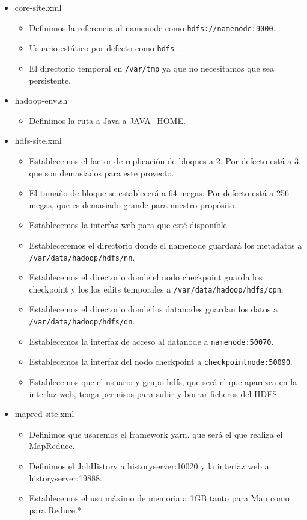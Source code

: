 \begin{itemize}
\item core-site.xml
  \begin{itemize}
  \item Definimos la referencia al namenode como {\tt hdfs://namenode:9000}.
  \item Usuario estático por defecto como {\tt hdfs} .
  \item El directorio temporal en {\tt /var/tmp} ya que no necesitamos que sea
    persistente.
  \end{itemize}

\item hadoop-env.sh
  \begin{itemize}
  \item Definimos la ruta a Java a JAVA\_HOME.
  \end{itemize}

\item hdfs-site.xml
  \begin{itemize}
  \item Establecemos el factor de replicación de bloques a 2. Por defecto
    está a 3, que son demasiados para este proyecto.
  \item El tamaño de bloque se establecerá a 64 megas. Por defecto está a
    256 megas, que es demasiado grande para nuestro propósito.
  \item Establecemos la interfaz web para que esté disponible.
  \item Estableceremos el directorio donde el namenode guardará los
    metadatos a {\tt /var/data/hadoop/hdfs/nn}.
  \item Establecemos el directorio donde el nodo checkpoint guarda los
    checkpoint y los los edits temporales a {\tt /var/data/hadoop/hdfs/cpn}.
  \item Establecemos el directorio donde los datanodes guardan los datos a
    {\tt /var/data/hadoop/hdfs/dn}.
  \item Establecemos la interfaz de acceso al datanode a {\tt namenode:50070}.
  \item Establecemos la interfaz del nodo checkpoint a
    {\tt checkpointnode:50090}.
  \item Establecemos que el usuario y grupo hdfs, que será el que aparezca
    en la interfaz web, tenga permisos para subir y borrar ficheros del
    HDFS.
  \end{itemize}

\item mapred-site.xml
  \begin{itemize}
  \item Definimos que usaremos el framework yarn, que será el que realiza
    el MapReduce.
  \item Definimos el JobHistory a historyserver:10020 y la interfaz web a
    historyserver:19888.
  \item Establecemos el uso máximo de memoria a 1GB tanto para Map como
    para Reduce.*
  \end{itemize}


\end{itemize}
